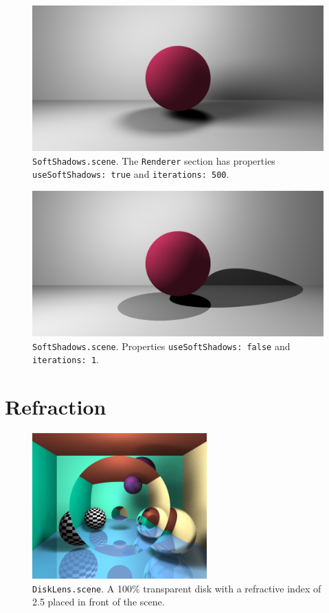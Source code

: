 \documentclass{article}
\begin{document}
\begin{figure}[H]
    \centering
    \includegraphics[width=\textwidth]{./examples/SoftShadows.png}
    \caption{\texttt{SoftShadows.scene}. The \texttt{Renderer} section has properties \texttt{useSoftShadows: true} and \texttt{iterations: 500}.}
\end{figure}

\begin{figure}[H]
    \centering
    \includegraphics[width=\textwidth]{./examples/SoftShadowsOff.png}
    \caption{\texttt{SoftShadows.scene}. Properties \texttt{useSoftShadows: false} and \texttt{iterations: 1}.}
\end{figure}

\section{Refraction}

\begin{figure}[H]
    \centering
    \includegraphics[width=0.6\textwidth]{./examples/DiskLens.png}
    \caption{\texttt{DiskLens.scene}. A 100\% transparent disk with a refractive index of 2.5 placed in front of the scene.}
\end{figure}
\end{document}
